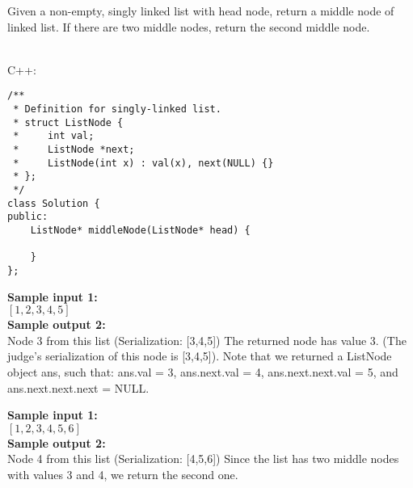\documentclass[a4paper]{article}
\begin{document}
Given a non-empty, singly linked list with head node, return a middle node of linked list. If there are two middle nodes, return the second middle node.

\ \\

\noindent C++:

\begin{lstlisting}[style=C++]
/**
 * Definition for singly-linked list.
 * struct ListNode {
 *     int val;
 *     ListNode *next;
 *     ListNode(int x) : val(x), next(NULL) {}
 * };
 */
class Solution {
public:
    ListNode* middleNode(ListNode* head) {
        
    }
};
\end{lstlisting}

\LINE

\noindent \textbf{Sample input 1:}\\
$[1, 2, 3, 4, 5]$\\

\noindent \textbf{Sample output 2:}\\
Node 3 from this list (Serialization: [3,4,5])
The returned node has value 3.  (The judge's serialization of this node is [3,4,5]).
Note that we returned a ListNode object ans, such that:
ans.val = 3, ans.next.val = 4, ans.next.next.val = 5, and ans.next.next.next = NULL.

\SPACE

\noindent \textbf{Sample input 1:}\\
$[1, 2, 3, 4, 5, 6]$\\

\noindent \textbf{Sample output 2:}\\
Node 4 from this list (Serialization: [4,5,6])
Since the list has two middle nodes with values 3 and 4, we return the second one.
\end{document}
